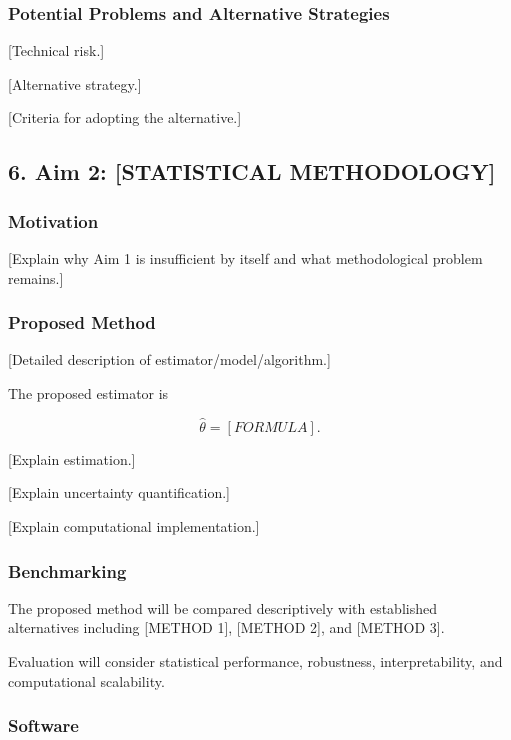 \documentclass[
  11pt,
  letterpaper,
]{article}
\begin{document}
\subsubsection{Potential Problems and Alternative
Strategies}\label{potential-problems-and-alternative-strategies}

{[}Technical risk.{]}

{[}Alternative strategy.{]}

{[}Criteria for adopting the alternative.{]}

\subsection{6. Aim 2: {[}STATISTICAL
METHODOLOGY{]}}\label{aim-2-statistical-methodology}

\subsubsection{Motivation}\label{motivation-1}

{[}Explain why Aim 1 is insufficient by itself and what methodological
problem remains.{]}

\subsubsection{Proposed Method}\label{proposed-method}

{[}Detailed description of estimator/model/algorithm.{]}

The proposed estimator is

\[
\widehat{\theta} = [FORMULA].
\]

{[}Explain estimation.{]}

{[}Explain uncertainty quantification.{]}

{[}Explain computational implementation.{]}

\subsubsection{Benchmarking}\label{benchmarking}

The proposed method will be compared descriptively with established
alternatives including {[}METHOD 1{]}, {[}METHOD 2{]}, and {[}METHOD
3{]}.

Evaluation will consider statistical performance, robustness,
interpretability, and computational scalability.

\subsubsection{Software}\label{software}
\end{document}
